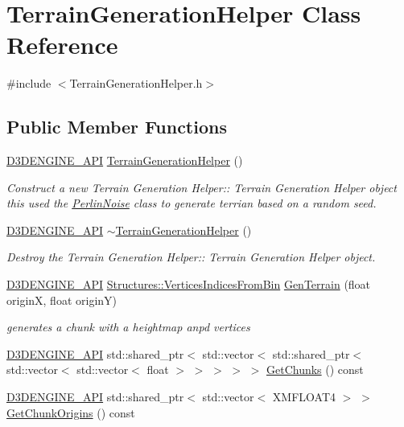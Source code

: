 \hypertarget{class_terrain_generation_helper}{}\section{Terrain\+Generation\+Helper Class Reference}
\label{class_terrain_generation_helper}


{\ttfamily \#include $<$Terrain\+Generation\+Helper.\+h$>$}

\subsection*{Public Member Functions}
\begin{DoxyCompactItemize}
\item 
\mbox{\hyperlink{stdafx_8h_a8ee2d990c5dfba7794dd2b60741d7722}{D3\+D\+E\+N\+G\+I\+N\+E\+\_\+\+A\+PI}} \mbox{\hyperlink{class_terrain_generation_helper_ab9eabdae4f687c9783698fe7e797d7b7}{Terrain\+Generation\+Helper}} ()
\begin{DoxyCompactList}\small\item\em Construct a new Terrain Generation Helper\+:\+: Terrain Generation Helper object this used the \mbox{\hyperlink{class_perlin_noise}{Perlin\+Noise}} class to generate terrian based on a random seed. \end{DoxyCompactList}\item 
\mbox{\hyperlink{stdafx_8h_a8ee2d990c5dfba7794dd2b60741d7722}{D3\+D\+E\+N\+G\+I\+N\+E\+\_\+\+A\+PI}} \mbox{\hyperlink{class_terrain_generation_helper_ae0a170d1d0fa0615f143ca6700bf1c27}{$\sim$\+Terrain\+Generation\+Helper}} ()
\begin{DoxyCompactList}\small\item\em Destroy the Terrain Generation Helper\+:\+: Terrain Generation Helper object. \end{DoxyCompactList}\item 
\mbox{\hyperlink{stdafx_8h_a8ee2d990c5dfba7794dd2b60741d7722}{D3\+D\+E\+N\+G\+I\+N\+E\+\_\+\+A\+PI}} \mbox{\hyperlink{struct_structures_1_1_vertices_indices_from_bin}{Structures\+::\+Vertices\+Indices\+From\+Bin}} \mbox{\hyperlink{class_terrain_generation_helper_a65a817889d9c9dbfd94118a42115cd38}{Gen\+Terrain}} (float originX, float originY)
\begin{DoxyCompactList}\small\item\em generates a chunk with a heightmap anpd vertices \end{DoxyCompactList}\item 
\mbox{\hyperlink{stdafx_8h_a8ee2d990c5dfba7794dd2b60741d7722}{D3\+D\+E\+N\+G\+I\+N\+E\+\_\+\+A\+PI}} std\+::shared\+\_\+ptr$<$ std\+::vector$<$ std\+::shared\+\_\+ptr$<$ std\+::vector$<$ std\+::vector$<$ float $>$ $>$ $>$ $>$ $>$ \mbox{\hyperlink{class_terrain_generation_helper_ab15c104c37244b4a8cea90da6a771b53}{Get\+Chunks}} () const
\item 
\mbox{\hyperlink{stdafx_8h_a8ee2d990c5dfba7794dd2b60741d7722}{D3\+D\+E\+N\+G\+I\+N\+E\+\_\+\+A\+PI}} std\+::shared\+\_\+ptr$<$ std\+::vector$<$ X\+M\+F\+L\+O\+A\+T4 $>$ $>$ \mbox{\hyperlink{class_terrain_generation_helper_a86694a8373034cce99eb4e624c559163}{Get\+Chunk\+Origins}} () const
\end{DoxyCompactItemize}
